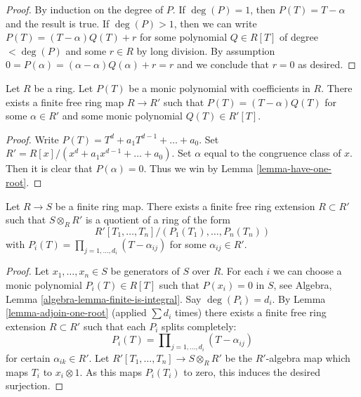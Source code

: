 \begin{proof}
By induction on the degree of $P$. If $\deg(P) = 1$, then
$P(T) = T - \alpha$ and the result is true. If $\deg(P) > 1$, then
we can write $P(T) = (T - \alpha)Q(T) + r$ for some polynomial
$Q \in R[T]$ of degree $< \deg(P)$ and some $r \in R$ by long
division. By assumption $0 = P(\alpha) = (\alpha - \alpha)Q(\alpha) + r = r$
and we conclude that $r = 0$ as desired.
\end{proof}

\begin{lemma}
\label{lemma-adjoin-one-root}
Let $R$ be a ring. Let $P(T)$ be a monic polynomial with coefficients
in $R$. There exists a finite free ring map $R \to R'$ such that
$P(T) = (T - \alpha)Q(T)$ for some $\alpha \in R'$ and some
monic polynomial $Q(T) \in R'[T]$.
\end{lemma}

\begin{proof}
Write $P(T) = T^d + a_1T^{d - 1} + \ldots + a_0$.
Set $R' = R[x]/(x^d + a_1x^{d - 1} + \ldots + a_0)$.
Set $\alpha$ equal to the congruence class of $x$.
Then it is clear that $P(\alpha) = 0$. Thus we win by
Lemma \ref{lemma-have-one-root}.
\end{proof}

\begin{lemma}
\label{lemma-finite-split}
Let $R \to S$ be a finite ring map.
There exists a finite free ring extension $R \subset R'$ such
that $S \otimes_R R'$ is a quotient of a ring of the form
$$
R'[T_1, \ldots, T_n]/(P_1(T_1), \ldots, P_n(T_n))
$$
with $P_i(T) = \prod_{j = 1, \ldots, d_i} (T - \alpha_{ij})$ for some
$\alpha_{ij} \in R'$.
\end{lemma}

\begin{proof}
Let $x_1, \ldots, x_n \in S$ be generators of $S$ over $R$.
For each $i$ we can choose a monic polynomial $P_i(T) \in R[T]$
such that $P(x_i) = 0$ in $S$, see
Algebra, Lemma \ref{algebra-lemma-finite-is-integral}.
Say $\deg(P_i) = d_i$. By
Lemma \ref{lemma-adjoin-one-root}
(applied $\sum d_i$ times) there exists a finite free ring
extension $R \subset R'$ such that each $P_i$ splits completely:
$$
P_i(T) = \prod\nolimits_{j = 1, \ldots, d_i} (T - \alpha_{ij})
$$
for certain $\alpha_{ik} \in R'$. Let
$R'[T_1, \ldots, T_n] \to S \otimes_R R'$ be the $R'$-algebra map
which maps $T_i$ to $x_i \otimes 1$. As this maps $P_i(T_i)$ to zero,
this induces the desired surjection.
\end{proof}

